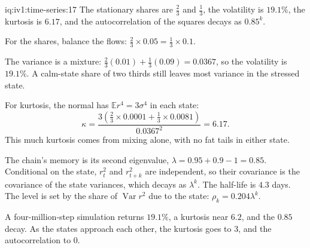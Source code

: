 \enlargethispage{-3\baselineskip}%
\begin{solution}{iq:iv1:time-series:17}
The stationary shares are $\frac23$ and $\frac13$, the volatility is $19.1\%$, the kurtosis is $6.17$, and the autocorrelation of the squares decays as $0.85^k$.

For the shares, balance the flows: $\frac23 \times 0.05 = \frac13 \times 0.1$.

The variance is a mixture: $\frac23(0.01) + \frac13(0.09) = 0.0367$, so the volatility is $19.1\%$. A calm-state share of two thirds still leaves most variance in the stressed state.

For kurtosis, the normal has $\mathbb{E}r^4 = 3\sigma^4$ in each state:
\[
\kappa = \frac{3(\frac23 \times 0.0001 + \frac13 \times 0.0081)}{0.0367^2} = 6.17.
\]
This much kurtosis comes from mixing alone, with no fat tails in either state.

The chain's memory is its second eigenvalue, $\lambda = 0.95 + 0.9 - 1 = 0.85$. Conditional on the state, $r_t^2$ and $r_{t + k}^2$ are independent, so their covariance is the covariance of the state variances, which decays as $\lambda^k$. The half-life is $4.3$ days. The level is set by the share of $\operatorname{Var}r^2$ due to the state: $\rho_k = 0.204\lambda^k$.

A four-million-step simulation returns $19.1\%$, a kurtosis near $6.2$, and the $0.85$ decay. As the states approach each other, the kurtosis goes to 3, and the autocorrelation to 0.



\end{solution}

